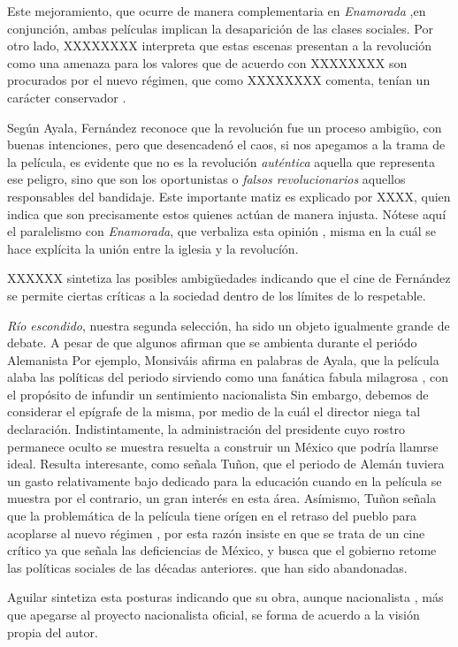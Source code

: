 Este mejoramiento, que ocurre de manera complementaria en \emph{Enamorada} %
,en conjunción, ambas películas implican la desaparición de las clases sociales. %
Por otro lado, XXXXXXXX interpreta que estas escenas presentan a la revolución como una amenaza %
para los valores que de acuerdo con XXXXXXXX 
son procurados por el nuevo régimen,
que como XXXXXXXX comenta, tenían un carácter conservador  %
.

Según Ayala, Fernández reconoce que la revolución fue un proceso ambigüo, con buenas intenciones, pero que desencadenó el caos, %
si nos apegamos a la trama de la película, es evidente que no es la revolución \emph{auténtica} aquella que representa ese peligro, sino que son los oportunistas o \emph{falsos revolucionarios} aquellos responsables del bandidaje. %
Este importante matiz es explicado por XXXX, quien indica que son precisamente estos quienes actúan de manera injusta.
Nótese aquí el paralelismo con \emph{Enamorada}, que verbaliza esta opinión %
, misma en la cuál se hace explícita la unión entre la iglesia y la revolucíón.%

XXXXXX sintetiza  las posibles ambigüedades indicando que el cine de Fernández se permite ciertas críticas a la sociedad dentro de los límites de lo respetable.%


\emph{Río escondido}, nuestra segunda selección, ha sido un objeto igualmente grande de debate.%
A pesar de que algunos afirman que se ambienta durante el periódo Alemanista %
Por ejemplo, Monsiváis afirma en palabras de Ayala, que la película alaba las políticas del periodo sirviendo como una fanática fabula milagrosa%
, con el propósito de infundir un sentimiento nacionalista%
Sin embargo, debemos de considerar el epígrafe de la misma, por medio de la cuál el director niega tal declaración.%
Indistintamente, la administración del presidente cuyo rostro permanece oculto%
se muestra resuelta a construir un México que podría llamrse ideal.%
Resulta interesante, como señala Tuñon, que el periodo de Alemán tuviera un gasto relativamente bajo dedicado para la educación %
cuando en la película se muestra por el contrario, un gran interés en esta área. %
Asímismo, Tuñon señala que la problemática de la película tiene orígen en el retraso del pueblo para acoplarse al nuevo régimen%
, por esta razón insiste en que se trata de un cine crítico ya que señala las deficiencias de México, y busca que el gobierno retome las políticas sociales de las décadas anteriores.%
que han sido abandonadas.%

Aguilar sintetiza esta posturas indicando que su obra, aunque nacionalista%
, más que apegarse al proyecto nacionalista oficial, se forma de acuerdo a la visión propia del autor. %
\pagebreak
